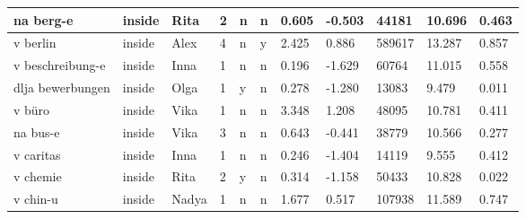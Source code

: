 \begin{longtable}{|p{4cm}|p{1cm}|p{1.2cm}|p{0.5cm}|p{0.5cm}|p{0.5cm}|R{1cm}|R{1cm}|R{1cm}|R{1cm}|R{1cm}|}
na berg-e                  & inside            & Rita          & 2                                   & n                          & n                          & 0.605      & -0.503        & 44181                   & 10.696                        & 0.463                   \\ \hline
v berlin                   & inside            & Alex          & 4                                   & n                          & y                          & 2.425      & 0.886         & 589617                  & 13.287                        & 0.857                   \\ \hline
v beschreibung-e           & inside            & Inna          & 1                                   & n                          & n                          & 0.196      & -1.629        & 60764                   & 11.015                        & 0.558                   \\ \hline
dlja bewerbungen           & inside            & Olga          & 1                                   & y                          & n                          & 0.278      & -1.280        & 13083                   & 9.479                         & 0.011                   \\ \hline
v b\"{u}ro                 & inside            & Vika          & 1                                   & n                          & n                          & 3.348      & 1.208         & 48095                   & 10.781                        & 0.411                   \\ \hline
na bus-e                   & inside            & Vika          & 3                                   & n                          & n                          & 0.643      & -0.441        & 38779                   & 10.566                        & 0.277                   \\ \hline
v caritas                  & inside            & Inna          & 1                                   & n                          & n                          & 0.246      & -1.404        & 14119                   & 9.555                         & 0.412                   \\ \hline
v chemie                   & inside            & Rita          & 2                                   & y                          & n                          & 0.314      & -1.158        & 50433                   & 10.828                        & 0.022                   \\ \hline
v chin-u                   & inside            & Nadya         & 1                                   & n                          & n                          & 1.677      & 0.517         & 107938                  & 11.589                        & 0.747                   \\ \hline

\end{longtable}
